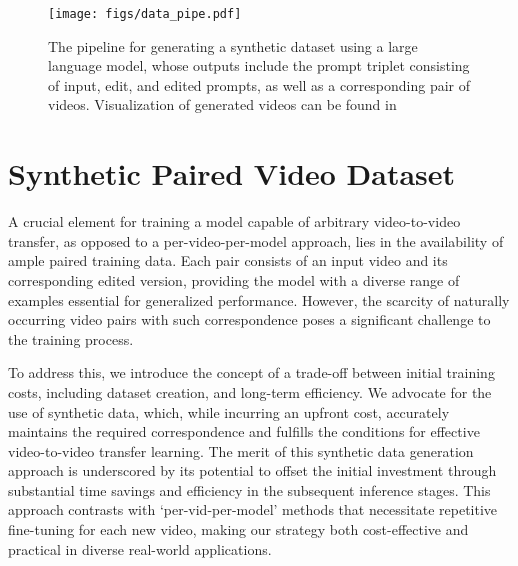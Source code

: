 \begin{figure}[th]
    \centering
    \texttt{[image: figs/data\_pipe.pdf]}
    \caption{The pipeline for generating a synthetic dataset using a large language model, whose outputs include the prompt triplet consisting of input, edit, and edited prompts, as well as a corresponding pair of videos. Visualization of generated videos can be found in }
    \label{fig:synthetic_dataset}
\end{figure}


\section{Synthetic Paired Video Dataset}\label{sec.synthetic_data_pipe}



A crucial element for training a model capable of arbitrary video-to-video transfer, as opposed to a per-video-per-model approach, lies in the availability of ample paired training data. Each pair consists of an input video and its corresponding edited version, providing the model with a diverse range of examples essential for generalized performance. However, the scarcity of naturally occurring video pairs with such correspondence poses a significant challenge to the training process.

To address this, we introduce the concept of a trade-off between initial training costs, including dataset creation, and long-term efficiency. We advocate for the use of synthetic data, which, while incurring an upfront cost, accurately maintains the required correspondence and fulfills the conditions for effective video-to-video transfer learning. The merit of this synthetic data generation approach is underscored by its potential to offset the initial investment through substantial time savings and efficiency in the subsequent inference stages. This approach contrasts with `per-vid-per-model' methods that necessitate repetitive fine-tuning for each new video, making our strategy both cost-effective and practical in diverse real-world applications.

